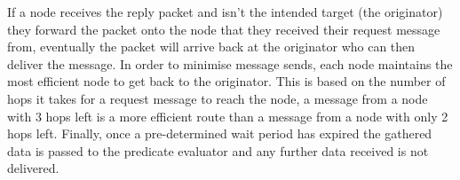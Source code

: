 If a node receives the reply packet and isn't the intended target (the originator) they forward the packet onto the node that they received their request message from, eventually the packet will arrive back at the originator who can then deliver the message. In order to minimise message sends, each node maintains the most efficient node to get back to the originator. This is based on the number of hops it takes for a request message to reach the node, a message from a node with 3 hops left is a more efficient route than a message from a node with only 2 hops left. Finally, once a pre-determined wait period has expired the gathered data is passed to the predicate evaluator and any further data received is not delivered.

\begin{figure}[H]
\centering
{}\hspace{5em}

\end{figure}
